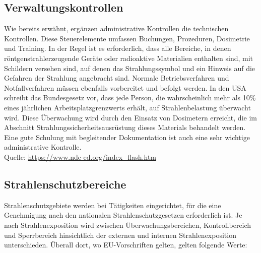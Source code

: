 \subsection{Verwaltungskontrollen}
Wie bereits erwähnt, ergänzen administrative Kontrollen die technischen Kontrollen. Diese Steuerelemente umfassen Buchungen, Prozeduren, Dosimetrie und Training. In der Regel ist es erforderlich, dass alle Bereiche, in denen röntgenstrahlerzeugende Geräte oder radioaktive Materialien enthalten sind, mit Schildern versehen sind, auf denen das Strahlungssymbol und ein Hinweis auf die Gefahren der Strahlung angebracht sind. Normale Betriebsverfahren und Notfallverfahren müssen ebenfalls vorbereitet und befolgt werden. In den USA schreibt das Bundesgesetz vor, dass jede Person, die wahrscheinlich mehr als 10\% eines jährlichen Arbeitsplatzgrenzwerts erhält, auf Strahlenbelastung überwacht wird. Diese Überwachung wird durch den Einsatz von Dosimetern erreicht, die im Abschnitt Strahlungssicherheitsausrüstung dieses Materials behandelt werden. Eine gute Schulung mit begleitender Dokumentation ist auch eine sehr wichtige administrative Kontrolle.\\
Quelle: \url{https://www.nde-ed.org/index_flash.htm}

\subsection{Strahlenschutzbereiche}
Strahlenschutzgebiete werden bei Tätigkeiten eingerichtet, für die eine Genehmigung nach den nationalen Strahlenschutzgesetzen erforderlich ist. Je nach Strahlenexposition wird zwischen Überwachungsbereichen, Kontrollbereich und Sperrbereich hinsichtlich der externen und internen Strahlenexposition unterschieden. Überall dort, wo EU-Vorschriften gelten, gelten folgende Werte:\\

